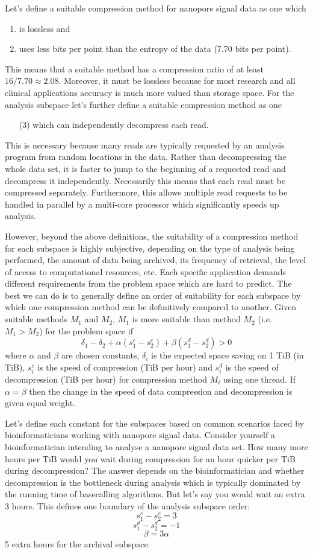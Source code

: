 Let's define a suitable compression method for nanopore signal data as
one which
\begin{enumerate}
	\item is lossless and
	\item uses less bits per point than the entropy of the data (7.70 bits per point).
\end{enumerate}
This means that a suitable method has a compression ratio of at least $16/7.70 \approx 2.08$.
Moreover, it must be lossless because for most research and all clinical
applications accuracy is much more valued than storage space. For
the analysis subspace let's further define a suitable compression method as one
\begin{enumerate}
	\item[(3)] which can independently decompress each read.
\end{enumerate}
This is necessary because many
reads are typically requested by an analysis program from random locations in
the data. Rather than decompressing the whole data set, it is faster to jump to
the beginning of a requested read and decompress it independently.
Necessarily this means that each read must be compressed separately.
Furthermore, this allows multiple read requests to be handled in parallel by a
multi-core processor which significantly speeds up analysis.

However, beyond the above definitions, the suitability of a compression method
for each subspace is highly subjective, depending on the type of analysis being
performed, the amount of data being archived, its frequency of retrieval, the
level of access to computational resources, etc. Each specific application
demands different requirements from the problem space which are hard to predict.
The best we can do is to generally define an order of suitability for each
subspace by which one compression method can be definitively compared to
another. Given suitable methods $M_1$ and $M_2$, $M_1$ is more suitable than
method $M_2$ (i.e. $M_1>M_2$) for the problem space if
\[\delta_1-\delta_2 + \alpha(s^c_1-s^c_2) + \beta(s^d_1-s^d_2) > 0\]
where $\alpha$ and $\beta$ are chosen constants, $\delta_i$ is the expected
space saving on 1 TiB (in TiB), $s^c_i$ is the speed of compression (TiB per
hour) and $s^d_i$ is the speed of decompression (TiB per hour) for compression
method $M_i$ using one thread. If $\alpha = \beta$ then the change in the speed
of data compression and decompression is given equal weight.

Let's define each constant for the subspaces based on common scenarios faced by
bioinformaticians working with nanopore signal data. Consider yourself a
bioinformatician intending to analyse a nanopore signal data set. How many
more hours per TiB would you wait during compression for an hour quicker per TiB
during decompression? The answer depends on the bioinformatician and whether
decompression is the bottleneck during analysis which is typically dominated by
the running time of basecalling algorithms. But let's say you would wait an
extra 3 hours. This defines one boundary of the analysis subspace order:
\[ s^c_1-s^c_2 = 3 \]
\[ s^d_1-s^d_2 = -1 \]
\[ \beta = 3\alpha \]
5 extra hours for the archival subspace.

